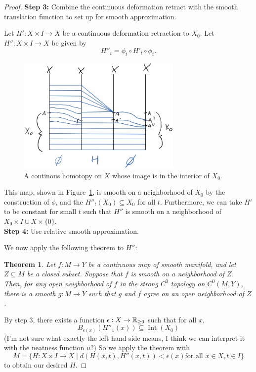 \documentclass{article}
\newtheorem{theorem}{Theorem}[section]
\newtheorem{proposed work}[theorem]{Proposed Work}
\DeclareMathOperator{\Int}{Int}
\begin{document}
\begin{proof}
\noindent  \textbf{Step 3:} Combine the continuous deformation retract with the smooth translation function to set up for smooth approximation.

  Let $H':X\times I\to X$ be a continuous deformation retraction to $X_0$. Let $H'': X\times I\to X$ be given by
  \[
    H''_t = \phi_t\circ H'_t\circ \phi_t.
  \]

  \begin{figure}[h]
    \centering
    \includegraphics[width=8cm]{smooth_retraction}
    \caption{A continous homotopy on $X$ whose image is in the interior of $X_0$.\label{fig:smooth_retraction}}
  \end{figure}
  This map, shown in Figure~\ref{fig:smooth_retraction}, is smooth on a neighborhood of $X_0$ by the construction of $\phi$, and the $H''_t(X_0)\subseteq X_0$ for all $t$. Furthermore, we can take $H'$ to be constant for small $t$ such that $H''$ is smooth on a neighborhood of $X_0\times I\cup X\times\{0\}$.\\

\noindent\textbf{Step 4:} Use relative smooth approximation.

  We now apply the following theorem to $H''$:
  \begin{theorem}
    Let $f:M\to Y$ be a continuous map of smooth manifold, and let $Z\subseteq M$ be a closed subset. Suppose that $f$ is smooth on a neighborhood of $Z$. 
    Then, for any open neighborhood of $f$ in the strong $C^0$ topology on $C^0(M,Y)$, there is a smooth $g:M\to Y$ such that $g$ and $f$ agree on an open neighborhood of $Z$.
  \end{theorem}

  By step 3, there exists a function $\epsilon: X\to \mathbb R_{\ge 0}$ such that for all $x,$
  \[
B_{\epsilon(x)}(H''_1(x))\subseteq \Int(X_0)
\]
(I'm not sure what exactly the left hand side means, I think we can interpret it with the neatness function $u$?) So we apply the theorem with
\[
  M = \{H:X\times I\to X\mid d(H(x,t), H''(x,t))<\epsilon(x)\text{for all }x\in X, t\in I\}
\]
to obtain our desired $H$.
\end{proof}
\end{document}
